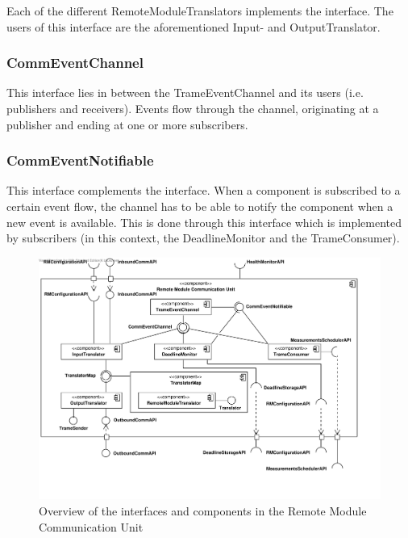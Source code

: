 \npar Each of the different RemoteModuleTranslators implements the
 interface. The users of this interface are the
aforementioned Input- and OutputTranslator.

\subsubsection{CommEventChannel}

\npar This interface lies in between the TrameEventChannel and its users (i.e.
publishers and receivers). Events flow through the channel, originating at a
publisher and ending at one or more subscribers.

\subsubsection{CommEventNotifiable}

\npar This interface complements the  interface.
When a component is subscribed to a certain event flow, the channel has to be able to
notify the component when a new event is available. This is done through this
interface which is implemented by subscribers (in this context, the
DeadlineMonitor and the TrameConsumer).

\begin{figure}[H]
	\begin{centering}
		\includegraphics[width=\textwidth]{figs/add-it2-interfaces.pdf}
		\caption{Overview of the interfaces and components in the Remote
		Module Communication Unit}
		\label{fig:it2/interfaces}
	\end{centering}
\end{figure}

